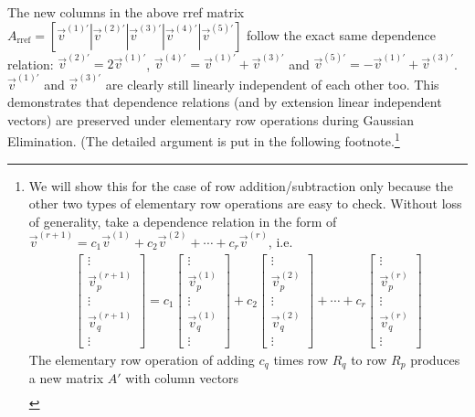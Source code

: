 The new columns in the above rref matrix $A_{\text{rref}} = [\vec{v}^{(1)'}|\vec{v}^{(2)'}|\vec{v}^{(3)'}|\vec{v}^{(4)'}|\vec{v}^{(5)'}]$ follow the exact same dependence relation: $\vec{v}^{(2)'} = 2\vec{v}^{(1)'}$, $\vec{v}^{(4)'} = \vec{v}^{(1)'} + \vec{v}^{(3)'}$ and $\vec{v}^{(5)'} = -\vec{v}^{(1)'} + \vec{v}^{(3)'}$. $\vec{v}^{(1)'}$ and $\vec{v}^{(3)'}$ are clearly still linearly independent of each other too. This demonstrates that dependence relations (and by extension linear independent vectors) are preserved under elementary row operations during Gaussian Elimination. (The detailed argument is put in the following footnote.\footnote{We will show this for the case of row addition/subtraction only because the other two types of elementary row operations are easy to check. Without loss of generality, take a dependence relation in the form of $\vec{v}^{(r+1)} = c_1\vec{v}^{(1)} + c_2\vec{v}^{(2)} + \cdots + c_r\vec{v}^{(r)}$, i.e. \begin{align*}
\begin{bmatrix}
\vdots \\
\vec{v}_p^{(r+1)} \\
\vdots \\
\vec{v}_q^{(r+1)} \\
\vdots
\end{bmatrix}
= c_1
\begin{bmatrix}
\vdots \\
\vec{v}_p^{(1)} \\
\vdots \\
\vec{v}_q^{(1)} \\
\vdots
\end{bmatrix}
+ c_2
\begin{bmatrix}
\vdots \\
\vec{v}_p^{(2)} \\
\vdots \\
\vec{v}_q^{(2)} \\
\vdots
\end{bmatrix} + \cdots + 
c_r
\begin{bmatrix}
\vdots \\
\vec{v}_p^{(r)} \\
\vdots \\
\vec{v}_q^{(r)} \\
\vdots
\end{bmatrix}
\end{align*}
The elementary row operation of adding $c_q$ times row $R_q$ to row $R_p$ produces a new matrix $A'$ with column vectors
\begin{align*}

\end{align*}}
